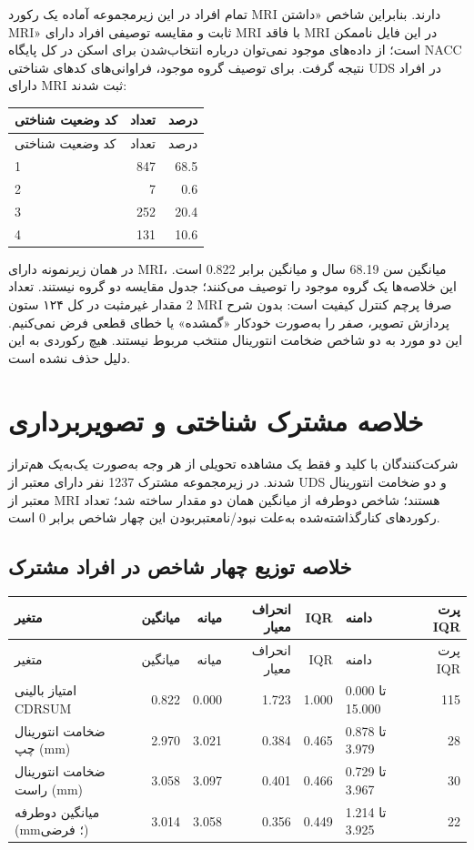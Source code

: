 \documentclass[a4paper,11pt]{article}
\newcommand{\Code}[1]{\lr{\texttt{\detokenize{#1}}}}
\newcommand{\En}[1]{\lr{#1}}
\begin{document}
تمام افراد \En{UDS} در این زیرمجموعه آماده یک رکورد MRI دارند.
بنابراین شاخص «داشتن MRI» ثابت و مقایسه توصیفی افراد دارای MRI با
فاقد MRI در این فایل ناممکن است؛ از داده‌های موجود نمی‌توان
درباره انتخاب‌شدن برای اسکن در کل پایگاه NACC نتیجه گرفت.
برای توصیف گروه موجود، فراوانی‌های کدهای شناختی UDS در افراد دارای MRI ثبت شدند:
\small
\begin{longtable}{ p{8.0cm} r r }
\toprule
کد وضعیت شناختی & تعداد & درصد \\
\midrule
\endfirsthead
\toprule
کد وضعیت شناختی & تعداد & درصد \\
\midrule
\endhead
1 & 847 & 68.5 \\
2 & 7 & 0.6 \\
3 & 252 & 20.4 \\
4 & 131 & 10.6 \\
\bottomrule
\end{longtable}
\normalsize

در همان زیرنمونه دارای MRI، میانگین سن 68.19 سال
و میانگین \Code{CDRSUM} برابر 0.822 است.
این خلاصه‌ها یک گروه موجود را توصیف می‌کنند؛ جدول مقایسه دو گروه نیستند.
تعداد 2 مقدار غیرمثبت در کل ۱۲۴ ستون
MRI صرفا پرچم کنترل کیفیت است: بدون شرح پردازش تصویر، صفر را
به‌صورت خودکار «گمشده» یا خطای قطعی فرض نمی‌کنیم. این دو مورد به دو
شاخص ضخامت انتورینال منتخب مربوط نیستند. هیچ رکوردی به این دلیل حذف نشده است.

\section{خلاصه مشترک شناختی و تصویربرداری}
شرکت‌کنندگان با کلید \Code{NACCID} و فقط یک مشاهده تحویلی از هر وجه
به‌صورت یک‌به‌یک هم‌تراز شدند. در زیرمجموعه مشترک 1237 نفر
دارای \Code{CDRSUM} معتبر از UDS و دو ضخامت انتورینال معتبر از MRI هستند؛ شاخص دوطرفه از میانگین همان دو مقدار ساخته شد؛
تعداد رکوردهای کنارگذاشته‌شده به‌علت نبود/نامعتبربودن این چهار شاخص برابر
0 است.

\subsection*{خلاصه توزیع چهار شاخص در افراد مشترک}
\small
\begin{longtable}{ p{3.5cm} r r r r p{2.3cm} r }
\toprule
متغیر & میانگین & میانه & انحراف معیار & IQR & دامنه & پرت IQR \\
\midrule
\endfirsthead
\toprule
متغیر & میانگین & میانه & انحراف معیار & IQR & دامنه & پرت IQR \\
\midrule
\endhead
امتیاز بالینی CDRSUM & 0.822 & 0.000 & 1.723 & 1.000 & 0.000 تا 15.000 & 115 \\
ضخامت انتورینال چپ (mm) & 2.970 & 3.021 & 0.384 & 0.465 & 0.878 تا 3.979 & 28 \\
ضخامت انتورینال راست (mm) & 3.058 & 3.097 & 0.401 & 0.466 & 0.729 تا 3.967 & 30 \\
میانگین دوطرفه (mm؛ فرضی) & 3.014 & 3.058 & 0.356 & 0.449 & 1.214 تا 3.925 & 22 \\
\bottomrule
\end{longtable}
\normalsize
\end{document}
